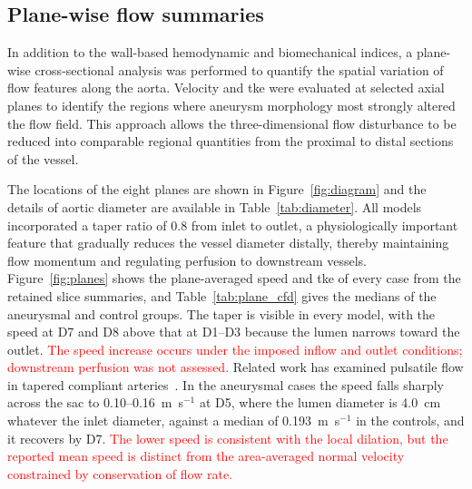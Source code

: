 \documentclass[12pt,a4paper]{article}
\newcommand{\cfdrevision}[1]{\textcolor{red}{#1}}
\newcommand{\TKE}{\ac{tke}\xspace}
\theoremstyle{definition}
\numberwithin{equation}{section}
\begin{document}



\subsection{Plane-wise flow summaries}
\label{sec:planes}

In addition to the wall-based hemodynamic and biomechanical indices, a plane-wise cross-sectional analysis was performed to quantify the spatial variation of flow features along the aorta. Velocity and \TKE were evaluated at selected axial planes to identify the regions where aneurysm morphology most strongly altered the flow field. This approach allows the three-dimensional flow disturbance to be reduced into comparable regional quantities from the proximal to distal sections of the vessel.

The locations of the eight planes are shown in Figure~\ref{fig:diagram} and the details of aortic diameter are available in Table~\ref{tab:diameter}. All models incorporated a taper ratio of 0.8 from inlet to outlet, a physiologically important feature that gradually reduces the vessel diameter distally, thereby maintaining flow momentum and regulating perfusion to downstream vessels. Figure~\ref{fig:planes} shows the plane-averaged speed and \TKE of every case from the retained slice summaries, and Table~\ref{tab:plane_cfd} gives the medians of the aneurysmal and control groups. The taper is visible in every model, with the speed at D7 and D8 above that at D1--D3 because the lumen narrows toward the outlet. \cfdrevision{The speed increase occurs under the imposed inflow and outlet conditions; downstream perfusion was not assessed.} Related work has examined pulsatile flow in tapered compliant arteries~\cite{kahveci2015numerical}. In the aneurysmal cases the speed falls sharply across the sac to 0.10--0.16~m~s$^{-1}$ at D5, where the lumen diameter is 4.0~cm whatever the inlet diameter, against a median of 0.193~m~s$^{-1}$ in the controls, and it recovers by D7. \cfdrevision{The lower speed is consistent with the local dilation, but the reported mean speed is distinct from the area-averaged normal velocity constrained by conservation of flow rate.}
\end{document}
